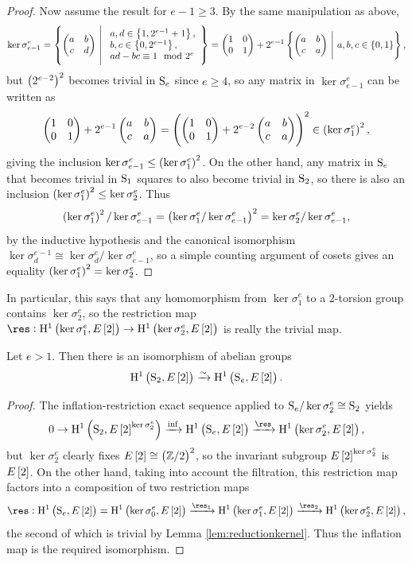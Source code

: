 \begin{proof}
\pagebreak

\noindent
Now assume the result for $ e - 1 \ge 3 $. By the same manipulation as above,
$$ \ker \sigma_{e - 1}^e = \cbr{\twobytwo{a}{b}{c}{d} \st \begin{array}{l} a, d \in \cbr{1, 2^{e - 1} + 1}, \\ b, c \in \cbr{0, 2^{e - 1}}, \\ ad - bc \equiv 1 \mod 2^e \end{array}} = \twobytwo{1}{0}{0}{1} + 2^{e - 1}\cbr{\twobytwo{a}{b}{c}{a} \st a, b, c \in \cbr{0, 1}}, $$
but $ \br{2^{e - 2}}^2 $ becomes trivial in $ \S_e $ since $ e \ge 4 $, so any matrix in $ \ker \sigma_{e - 1}^e $ can be written as
$$ \twobytwo{1}{0}{0}{1} + 2^{e - 1}\twobytwo{a}{b}{c}{a} = \br{\twobytwo{1}{0}{0}{1} + 2^{e - 2}\twobytwo{a}{b}{c}{a}}^2 \in \br{\ker \sigma_1^e}^2, $$
giving the inclusion $ \ker \sigma_{e - 1}^e \le \br{\ker \sigma_1^e}^2 $. On the other hand, any matrix in $ \S_e $ that becomes trivial in $ \S_1 $ squares to also become trivial in $ \S_2 $, so there is also an inclusion $ \br{\ker \sigma_1^e}^2 \le \ker \sigma_2^e $. Thus
$$ \br{\ker \sigma_1^e}^2 / \ker \sigma_{e - 1}^e = \br{\ker \sigma_1^e / \ker \sigma_{e - 1}^e}^2 = \ker \sigma_2^e / \ker \sigma_{e - 1}^e, $$
by the inductive hypothesis and the canonical isomorphism $ \ker \sigma_d^{e - 1} \cong \ker \sigma_d^e / \ker \sigma_{e - 1}^e $, so a simple counting argument of cosets gives an equality $ \br{\ker \sigma_1^e}^2 = \ker \sigma_2^e $.
\end{proof}

In particular, this says that any homomorphism from $ \ker \sigma_1^e $ to a $ 2 $-torsion group contains $ \ker \sigma_2^e $, so the restriction map $ \res : \HE[2]{\ker \sigma_1^e} \to \HE[2]{\ker \sigma_2^e} $ is really the trivial map.

\begin{lemma}
\label{lem:twospecial}
Let $ e > 1 $. Then there is an isomorphism of abelian groups
$$ \HE[2]{\S_2} \xrightarrow{\sim} \HE[2]{\S_e}. $$
\end{lemma}

\begin{proof}
The inflation-restriction exact sequence applied to $ \S_e / \ker \sigma_2^e \cong \S_2 $ yields
$$ 0 \to \H^1\br{\S_2, E\sbr{2}^{\ker \sigma_2^e}} \xrightarrow{\inf} \HE[2]{\S_e} \xrightarrow{\res} \HE[2]{\ker \sigma_2^e}, $$
but $ \ker \sigma_2^e $ clearly fixes $ E\sbr{2} \cong \br{\ZZ / 2}^2 $, so the invariant subgroup $ E\sbr{2}^{\ker \sigma_2^e} $ is $ E\sbr{2} $. On the other hand, taking into account the filtration, this restriction map factors into a composition of two restriction maps
$$ \res : \HE[2]{\S_e} = \HE[2]{\ker \sigma_0^e} \xrightarrow{\res_1} \HE[2]{\ker \sigma_1^e} \xrightarrow{\res_2} \HE[2]{\ker \sigma_2^e}, $$
the second of which is trivial by Lemma \ref{lem:reductionkernel}. Thus the inflation map is the required isomorphism.
\end{proof}

